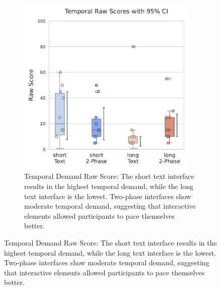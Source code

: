 \begin{figure}[h]
\begin{subfigure}[b]{0.52\textwidth}
        \label{fig:total_time}
    \end{subfigure}
    \hfill
    \begin{subfigure}[b]{0.38\textwidth}
        \centering
        \includegraphics[width=0.95\textwidth, trim=0 13 0 13, clip]{content/image/cog/Temporal_scores.pdf}
        \captionsetup{width=\textwidth, justification=justified} %
        \caption{Temporal Demand Raw Score: The short text interface results in the highest temporal demand, while the long text interface is the lowest. Two-phase interfaces show moderate temporal demand, suggesting that interactive elements allowed participants to pace themselves better.}
        \label{fig:temporal_cog_score}
    \end{subfigure}
\end{figure}

